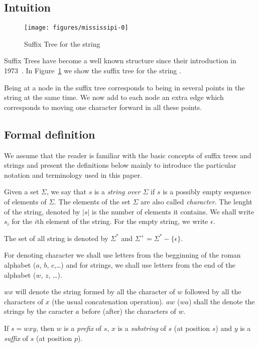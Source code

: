 \subsection{Intuition}

\begin{figure}
\texttt{[image: figures/mississipi-0]}
\caption{Suffix Tree for the string }%
\label{fig:mississipi-0}
\end{figure}

Suffix Trees have become a well known structure since their introduction in 1973~\cite{weiner}. In Figure~\ref{fig:mississipi-0} we show the suffix tree for the string .

Being at a node in the suffix tree corresponds to being in several points in the string at the same time. We now add to each node an extra edge which corresponds to moving one character forward in all these points.

\subsection{Formal definition}

We assume that the reader is familiar with the basic concepts of suffix trees and strings and present the definitions below mainly to introduce the particular notation and terminology used in this paper.

\begin{definition}
Given a set $\Sigma$, we say that $s$ is a \emph{string over $\Sigma$} if $s$ is a possibly empty sequence of elements of $\Sigma$. The elements of the set $\Sigma$ are also called \emph{character}. The lenght of the string, denoted by $|s|$ is the number of elements it contains. We shall write $s_i$ for the $i$th element of the string. For the empty string, we write $\epsilon$.

The set of all string is denoted by $\Sigma^*$ and $\Sigma^+=\Sigma^*-\{\epsilon\}$.
\end{definition}

For denoting character we shall use letters from the begginning of the roman alphabet ($a$, $b$, $c$,\ldots) and for strings, we shall use letters from the end of the alphabet ($w$, $z$, \ldots).

\begin{definition}
$wx$ will denote the string formed by all the character of $w$ followed by all the characters of $x$ (the usual concatenation operation). $aw$ ($wa$) shall the denote the strings by the caracter $a$ before (after) the characters of $w$.

If $s = wxy$, then $w$ is a \emph{prefix} of $s$, $x$ is a \emph{substring} of $s$ (at position $s$) and $y$ is a \emph{suffix} of $s$ (at position $p$).
\end{definition}


